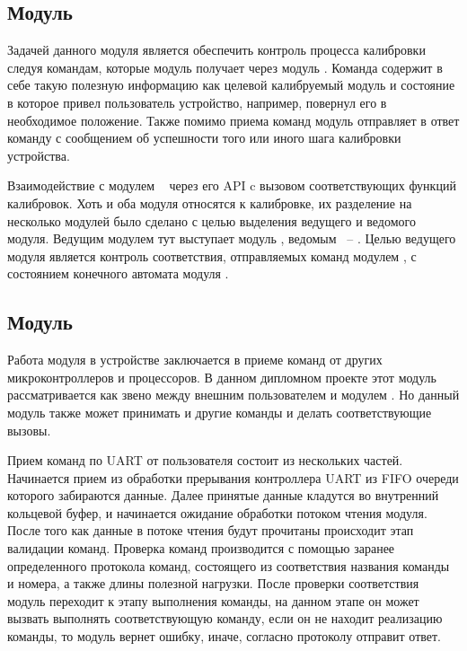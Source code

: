 

\subsection{Модуль \moduleCalibControl}

Задачей данного модуля является обеспечить контроль процесса калибровки следуя командам, которые модуль получает
через модуль \moduleUart. Команда содержит в себе такую полезную информацию как целевой калибруемый модуль и состояние 
в которое привел пользователь устройство, например, повернул его в необходимое положение. Также помимо приема команд 
модуль отправляет в ответ команду с сообщением об успешности того или иного шага калибровки устройства.

Взаимодействие с модулем \moduleCalib~ через его API c вызовом соответствующих функций калибровок. Хоть и оба модуля относятся к калибровке,
их разделение на несколько модулей было сделано с целью выделения ведущего и ведомого модуля. Ведущим модулем тут выступает модуль \moduleCalibControl, 
ведомым ~-- \moduleCalib. Целью ведущего модуля является контроль соответствия, отправляемых команд модулем \moduleUart, с состоянием конечного 
автомата модуля \moduleCalib. 


\subsection{Модуль \moduleUart}

Работа модуля в устройстве заключается в приеме команд от других микроконтроллеров и процессоров. В данном дипломном проекте
этот модуль рассматривается как звено между внешним пользователем и модулем \moduleCalib. Но данный модуль также может принимать
и другие команды и делать соответствующие вызовы. 

Прием команд по UART от пользователя состоит из нескольких частей. Начинается прием из обработки прерывания контроллера UART из 
FIFO очереди которого забираются данные. Далее принятые данные кладутся во внутренний кольцевой буфер, и начинается ожидание обработки
потоком чтения модуля. После того как данные в потоке чтения будут прочитаны происходит этап валидации команд. 
Проверка команд производится с помощью заранее определенного протокола команд, состоящего из соответствия названия команды и номера, 
а также длины полезной нагрузки. После проверки соответствия модуль переходит к этапу выполнения команды, на данном этапе он может вызвать
выполнять соответствующую команду, если он не находит реализацию команды, то модуль вернет ошибку, иначе, согласно протоколу отправит ответ.

